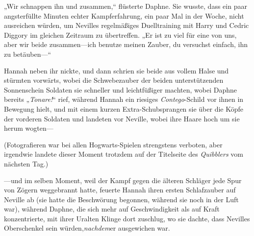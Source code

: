 \later

„Wir schnappen ihn und zusammen,“ flüsterte Daphne. Sie wusste, dass ein paar angsterfüllte Minuten echter Kampferfahrung, ein paar Mal in der Woche, nicht ausreichen würden, um Nevilles regelmäßiges Duelltraining mit Harry und Cedric Diggory im gleichen Zeitraum zu übertreffen. „Er ist zu viel für eine von uns, aber wir beide zusammen—ich benutze meinen Zauber, du versuchst einfach, ihn zu betäuben—“

Hannah neben ihr nickte, und dann schrien sie beide aus vollem Halse und stürmten vorwärts, wobei die Schwebezauber der beiden unterstützenden Sonnenschein Soldaten sie schneller und leichtfüßiger machten, wobei Daphne bereits „\emph{Tonare!}“ rief, während Hannah ein riesiges \emph{Contego}-Schild vor ihnen in Bewegung hielt, und mit einem kurzen Extra-Schubsprangen sie über die Köpfe der vorderen Soldaten und landeten vor Neville, wobei ihre Haare hoch um sie herum wogten—

(Fotografieren war bei allen Hogwarts-Spielen strengstens verboten, aber irgendwie landete dieser Moment trotzdem auf der Titelseite des \emph{Quibblers} vom nächsten Tag.)

—und im selben Moment, weil der Kampf gegen die älteren Schläger jede Spur von Zögern weggebrannt hatte, feuerte Hannah ihren ersten Schlafzauber auf Neville ab (sie hatte die Beschwörung begonnen, während sie noch in der Luft war), während Daphne, die sich mehr auf Geschwindigkeit als auf Kraft konzentrierte, mit ihrer Uralten Klinge dort zuschlug, wo sie dachte, dass Nevilles Oberschenkel sein würden,\emph{nachdem}er ausgewichen war.

